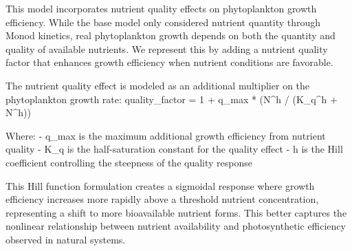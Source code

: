 This model incorporates nutrient quality effects on phytoplankton growth efficiency. While the base model only considered nutrient quantity through Monod kinetics, real phytoplankton growth depends on both the quantity and quality of available nutrients. We represent this by adding a nutrient quality factor that enhances growth efficiency when nutrient conditions are favorable.

The nutrient quality effect is modeled as an additional multiplier on the phytoplankton growth rate:
quality_factor = 1 + q_max * (N^h / (K_q^h + N^h))

Where:
- q_max is the maximum additional growth efficiency from nutrient quality
- K_q is the half-saturation constant for the quality effect  
- h is the Hill coefficient controlling the steepness of the quality response

This Hill function formulation creates a sigmoidal response where growth efficiency increases more rapidly above a threshold nutrient concentration, representing a shift to more bioavailable nutrient forms. This better captures the nonlinear relationship between nutrient availability and photosynthetic efficiency observed in natural systems.
